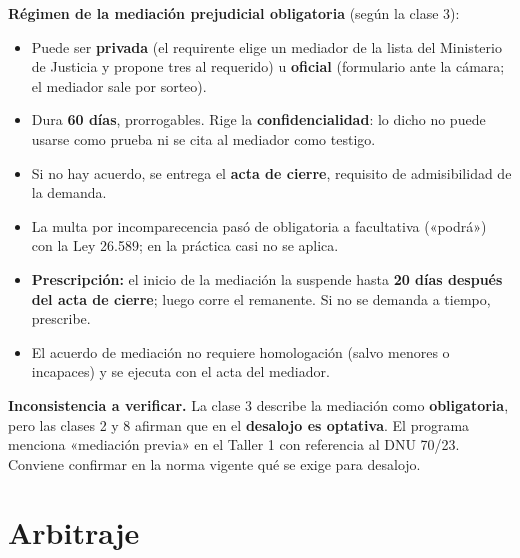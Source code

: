 \textbf{Régimen de la mediación prejudicial obligatoria} (según la clase 3):

\begin{itemize}
  \item Puede ser \textbf{privada} (el requirente elige un mediador de la lista del Ministerio de Justicia y propone tres al requerido) u \textbf{oficial} (formulario ante la cámara; el mediador sale por sorteo).
  \item Dura \textbf{60 días}, prorrogables. Rige la \textbf{confidencialidad}: lo dicho no puede usarse como prueba ni se cita al mediador como testigo.
  \item Si no hay acuerdo, se entrega el \textbf{acta de cierre}, requisito de admisibilidad de la demanda.
  \item La multa por incomparecencia pasó de obligatoria a facultativa («podrá») con la Ley 26.589; en la práctica casi no se aplica.
  \item \textbf{Prescripción:} el inicio de la mediación la suspende hasta \textbf{20 días después del acta de cierre}; luego corre el remanente. Si no se demanda a tiempo, prescribe.
  \item El acuerdo de mediación no requiere homologación (salvo menores o incapaces) y se ejecuta con el acta del mediador.
\end{itemize}

\begin{important}
\textbf{Inconsistencia a verificar.} La clase 3 describe la mediación como \textbf{obligatoria}, pero las clases 2 y 8 afirman que en el \textbf{desalojo es optativa}. El programa menciona «mediación previa» en el Taller 1 con referencia al DNU 70/23. Conviene confirmar en la norma vigente qué se exige para desalojo.
\end{important}

\section{Arbitraje}


